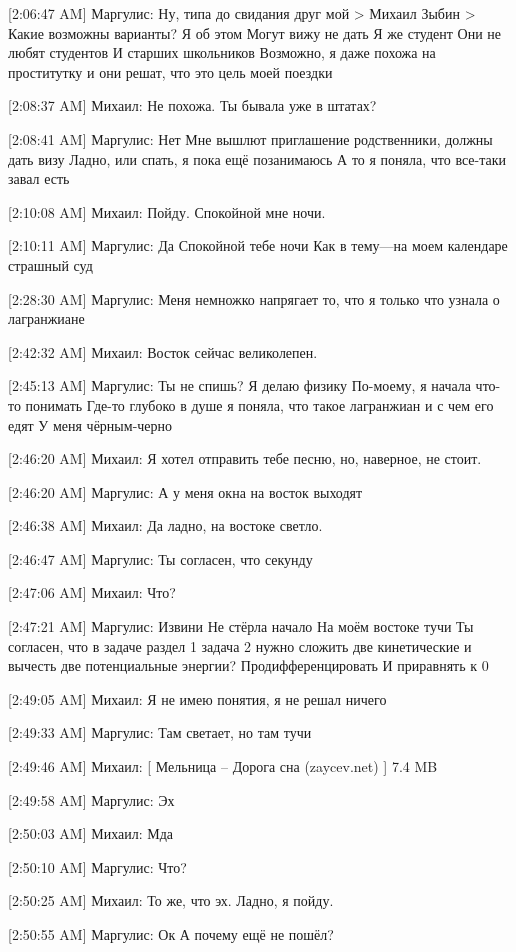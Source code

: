 \documentclass{article}
\begin{document}
[2:06:47 AM] Маргулис:
Ну, типа до свидания друг мой
> Михаил Зыбин
> Какие возможны варианты?
Я об этом
 Могут вижу не дать
 Я же студент
 Они не любят студентов
 И старших школьников
 Возможно, я даже похожа на проститутку и они решат, что это цель моей поездки

[2:08:37 AM] Михаил:
Не похожа. Ты бывала уже в штатах?

[2:08:41 AM] Маргулис:
Нет
 Мне вышлют приглашение родственники, должны дать визу
 Ладно, или спать, я пока ещё позанимаюсь
 А то я поняла, что все-таки завал есть

[2:10:08 AM] Михаил:
Пойду. Спокойной мне ночи.

[2:10:11 AM] Маргулис:
Да
 Спокойной тебе ночи
 Как в тему—на моем календаре страшный суд

[2:28:30 AM] Маргулис:
Меня немножко напрягает то, что я только что узнала о лагранжиане

[2:42:32 AM] Михаил:
Восток сейчас великолепен.

[2:45:13 AM] Маргулис:
Ты не спишь?
 Я делаю физику
 По-моему, я начала что-то понимать
 Где-то глубоко в душе я поняла, что такое лагранжиан и с чем его едят
 У меня чёрным-черно

[2:46:20 AM] Михаил:
Я хотел отправить тебе песню, но, наверное, не стоит.

[2:46:20 AM] Маргулис:
А у меня окна на восток выходят

[2:46:38 AM] Михаил:
Да ладно, на востоке светло.

[2:46:47 AM] Маргулис:
Ты согласен, что секунду

[2:47:06 AM] Михаил:
Что?

[2:47:21 AM] Маргулис:
Извини
 Не стёрла начало
 На моём востоке тучи
 Ты согласен, что в задаче раздел 1 задача 2 нужно сложить две кинетические и вычесть две потенциальные энергии?
 Продифференцировать
 И приравнять к 0

[2:49:05 AM] Михаил:
Я не имею понятия, я не решал ничего

[2:49:33 AM] Маргулис:
Там светает, но там тучи

[2:49:46 AM] Михаил:
[ Мельница – Дорога сна (zaycev.net)  ] 7.4 MB
 

[2:49:58 AM] Маргулис:
Эх

[2:50:03 AM] Михаил:
Мда

[2:50:10 AM] Маргулис:
Что?

[2:50:25 AM] Михаил:
То же, что эх.
 Ладно, я пойду.

[2:50:55 AM] Маргулис:
Ок
 А почему ещё не пошёл?
\end{document}
